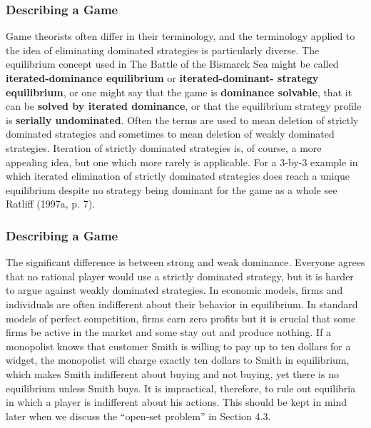  \begin{frame}[fragile]\frametitle{Describing a Game}

 Game theorists often differ in their  terminology,   and  the terminology
applied to the idea of eliminating dominated strategies is particularly diverse.
The equilibrium concept used in  The  Battle of the Bismarck Sea  might be
called    {\bf iterated-dominance equilibrium} or   {\bf iterated-dominant-
strategy equilibrium}, or one might say that the game is {\bf dominance
solvable}, that it    can be {\bf solved by iterated dominance}, or that the
equilibrium strategy profile is {\bf serially undominated}. Often the  terms
are used to mean deletion of strictly dominated strategies  and sometimes to
mean deletion of weakly dominated strategies. Iteration of strictly dominated
strategies is, of course, a more appealing idea, but one which more rarely is
applicable. For a  3-by-3 example  in which iterated elimination of  strictly
dominated strategies does reach  a unique equilibrium despite no strategy being
dominant for the   game   as a whole see  Ratliff (1997a, p. 7).

\end{frame}
 \begin{frame}[fragile]\frametitle{Describing a Game}
 
  The significant difference is between strong and weak dominance. Everyone
agrees that no rational player would use a strictly dominated strategy, but it
is harder to argue against weakly dominated strategies.   In economic models,
firms and individuals are often indifferent about their behavior in equilibrium.
In standard models of perfect competition, firms earn zero profits but it   is
crucial that some firms be active in the market and some stay out and produce
nothing. If a monopolist knows that customer Smith is willing to pay up to ten
dollars for a widget, the monopolist will charge exactly ten dollars to Smith in
equilibrium, which makes Smith  indifferent about buying and not buying, yet
there is no equilibrium unless Smith buys. It is  impractical, therefore, to
rule out equilibria in which a player is indifferent about his actions. This
should be kept in mind later when we discuss the  ``open-set problem'' in
Section 4.3.

\end{frame}
